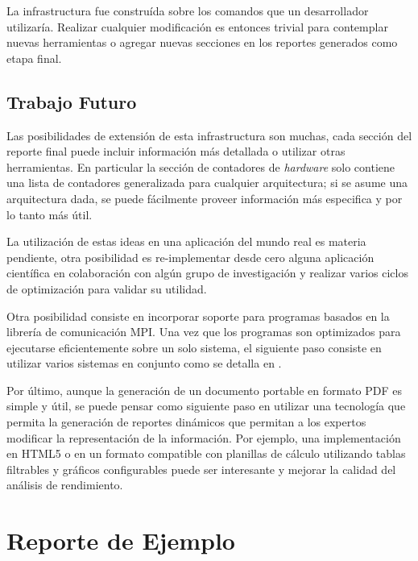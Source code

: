 \documentclass[a4paper]{report}
\begin{document}
\bigskip

La infrastructura fue construída sobre los comandos que un desarrollador utilizaría. Realizar cualquier modificación es entonces trivial para contemplar nuevas herramientas
o agregar nuevas secciones en los reportes generados como etapa final.

\section{Trabajo Futuro}

Las posibilidades de extensión de esta infrastructura son muchas, cada sección del reporte final puede incluir información más detallada o utilizar otras herramientas. En particular la sección de contadores de {\it hardware} solo contiene una lista de contadores generalizada para cualquier arquitectura; si se asume una arquitectura dada, se puede fácilmente proveer información más especifica y por lo tanto más útil.

\bigskip

La utilización de estas ideas en una aplicación del mundo real es materia pendiente, otra posibilidad es re-implementar desde cero alguna aplicación
científica en colaboración con algún grupo de investigación y realizar varios ciclos de optimización para validar su utilidad.

\bigskip

Otra posibilidad consiste en incorporar soporte para programas basados en la librería de comunicación MPI. Una vez que los programas son optimizados para ejecutarse eficientemente sobre un solo sistema, el siguiente paso consiste en utilizar varios sistemas en conjunto como se detalla en \cite{beowulf-parallel-workstation} \cite{tinetti}.

\bigskip

Por último, aunque la generación de un documento portable en formato PDF es simple y útil, se puede pensar como siguiente paso en utilizar una tecnología que permita la generación de reportes dinámicos que permitan a los expertos modificar la representación de la información. Por ejemplo, una implementación en HTML5 o en un formato compatible con planillas de cálculo utilizando tablas filtrables y gráficos configurables puede ser interesante y mejorar la calidad del análisis de rendimiento.



\appendix

\chapter{Reporte de Ejemplo} \label{examples}
\end{document}
